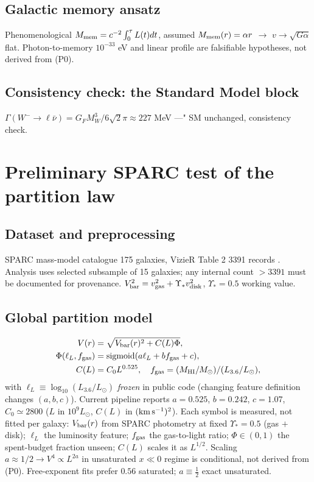 \documentclass[twocolumn]{aastex631}
\begin{document}
\subsection{Galactic memory ansatz}

Phenomenological $M_{\rm mem}=c^{-2}\int_{0}^{\tau}L(t)dt$, assumed $M_{\rm mem}(r)=\alpha r$ $\to$ $v\to\sqrt{G\alpha}$ flat. Photon-to-memory $10^{-33}$ eV and linear profile are falsifiable hypotheses, not derived from (P0).

\subsection{Consistency check: the Standard Model block}

$\Gamma(W^{-}\to\ell\bar\nu)=G_{F}M_{W}^{3}/6\sqrt2\pi\approx227$ MeV ---" SM unchanged, consistency check.

\section{Preliminary SPARC test of the partition law}
\label{sec:sparc}

\subsection{Dataset and preprocessing}

SPARC mass-model catalogue 175 galaxies, VizieR Table 2 3391 records \cite{SPARC}. Analysis uses selected subsample of 15 galaxies; any internal count $>3391$ must be documented for provenance. $V_{\rm bar}^{2}=v_{\rm gas}^{2}+\Upsilon_{*}v_{\rm disk}^{2}$, $\Upsilon_{*}=0.5$ working value.

\subsection{Global partition model}

\begin{align*}
V(r)&=\sqrt{V_{\rm bar}(r)^{2}+C(L)\Phi},\\
\Phi(\ell_{L},f_{\rm gas})&={\rm sigmoid}(a\ell_{L}+b f_{\rm gas}+c),\\
C(L)&=C_0L^{0.525},\quad f_{\rm gas}=(M_{\rm HI}/M_\odot)/(L_{3.6}/L_\odot),
\end{align*}
with $\ell_{L}\equiv\log_{10}(L_{3.6}/L_{\odot})$ \emph{frozen} in public code (changing feature definition changes $(a,b,c)$). Current pipeline reports $a=0.525$, $b=0.242$, $c=1.07$, $C_0\simeq2800$ ($L$ in $10^9L_\odot$, $C(L)$ in $({\rm km\,s^{-1}})^2$).
Each symbol is measured, not fitted per galaxy: $V_{\rm bar}(r)$ from SPARC photometry at fixed $\Upsilon_*=0.5$ (gas $+$ disk); $\ell_L$ the luminosity feature; $f_{\rm gas}$ the gas-to-light ratio; $\Phi\in(0,1)$ the spent-budget fraction unseen; $C(L)$ scales it as $L^{1/2}$. Scaling $a\approx1/2\to V^{4}\propto L^{2a}$ in unsaturated $x\ll0$ regime is conditional, not derived from (P0). Free-exponent fits prefer $0.56$ saturated; $a\equiv\frac12$ exact unsaturated.
\end{document}
